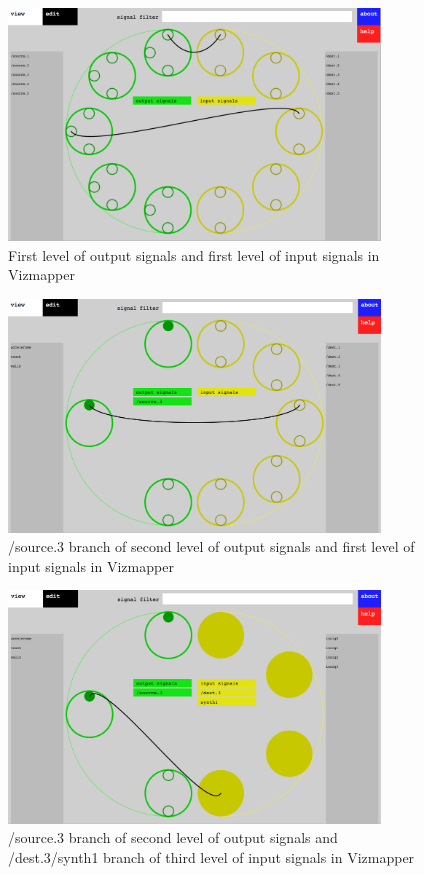 \begin{figure}[htb]
\centering
\includegraphics[width=0.88\textwidth]{root_level.png}
\caption{First level of output signals and first level of input signals in Vizmapper}
\label{fig:firstLevel}
\end{figure}

\begin{figure}[htb]
\centering
\includegraphics[width=0.88\textwidth]{left_first_level.png}
\caption{/source.3 branch of second level of output signals and first level of input signals in Vizmapper}
\label{fig:secondLevel}
\end{figure}

\begin{figure}[htb]
\centering
\includegraphics[width=0.88\textwidth]{right_second_level.png}
\caption{/source.3 branch of second level of output signals and /dest.3/synth1 branch of third level of input signals in Vizmapper}
\label{fig:thirdLevel}
\end{figure}


